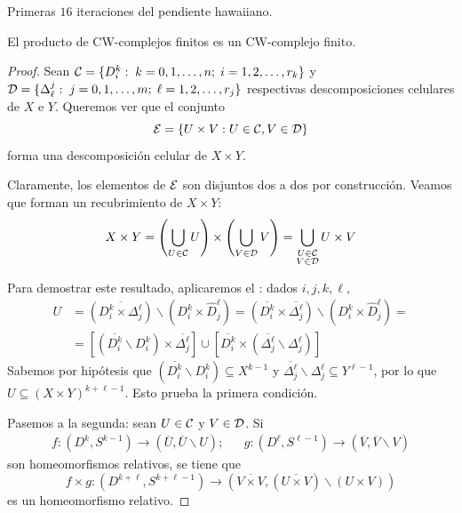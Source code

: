 \begin{marginfigure}

\caption{Primeras $16$ iteraciones del pendiente hawaiiano.}
\end{marginfigure}

\begin{proposition}
El producto de CW-complejos finitos es un CW-complejo finito.
\end{proposition}

\begin{proof}
Sean $\mathcal{C}=\{D_i^k:\; k=0,1,\dots,n; \;i=1,2,\dots,r_k\}$ y $\mathcal{D}=
\{\Delta_\ell^j:\; j=0,1,\dots,m; \;\ell=1,2,\dots,r_j\}$ respectivas
descomposiciones celulares de $X$ e $Y$. Queremos ver que el conjunto
\[\mathcal{E}=\{U\times V: U\in \mathcal{C}, V\in \mathcal{D}\}\]
forma una descomposición celular de $X\times Y$.

Claramente, los elementos de $\mathcal{E}$ son disjuntos dos a dos por
construcción. Veamos que forman un recubrimiento de $X\times Y$: 
\[X\times Y=
	\left(\bigcup_{U \in \mathcal{C}} U\right)\times
	\left(\bigcup_{V \in \mathcal{D}} V\right)=
	\bigcup_{\substack{U \in \mathcal{C}\\V \in \mathcal{D}}} U\times V\]

Para demostrar este resultado, aplicaremos el : dados
$i,j,k,\ell$,
\begin{align*}
U&=(\overline{D^k_i\times \Delta^\ell_j})\backslash
	(D^k_i\times \hat D^\ell_j)=
	(\overline{D^k_i}\times \overline{\Delta^\ell_j})\backslash
	(D^k_i\times \hat D^\ell_j)=\\
	&=[(\overline{D^k_i}\backslash D^k_i)\times \overline{\Delta^\ell_j}]\cup
	[\overline{D^k_i}\times (\overline{\Delta^\ell_j}\backslash \Delta^\ell_j)]
\end{align*}
Sabemos por hipótesis que $(\overline{D^k_i}\backslash D^k_i) \subseteq
X^{k-1}$ y $\overline{\Delta^\ell_j}\backslash \Delta^\ell_j \subseteq
Y^{\ell-1}$, por lo que $U \subseteq (X\times Y)^{k+\ell-1}$. Esto prueba la
primera condición.

Pasemos a la segunda: sean $U \in \mathcal{C}$ y $V \in \mathcal{D}$. Si
\begin{align*}
f\colon (D^k,S^{k-1}) \to (\overline{U},\overline{U}\backslash U); &&
g\colon (D^\ell,S^{\ell-1}) \to (\overline{V},\overline{V}\backslash V)
\end{align*}
son homeomorfismos relativos, se tiene que
\[f\times g\colon (D^{k+\ell},S^{k+\ell-1}) \to
(\overline{V\times V},(\overline{U\times V})\backslash (U\times V))\]
es un homeomorfismo relativo.
\end{proof}

